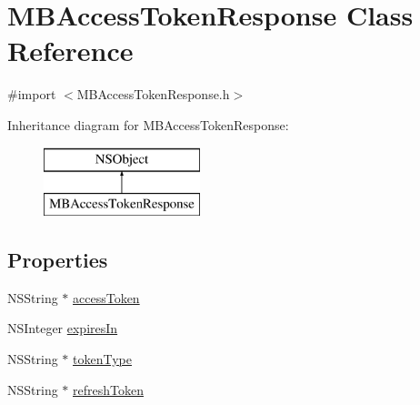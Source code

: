 \hypertarget{interface_m_b_access_token_response}{\section{M\-B\-Access\-Token\-Response Class Reference}
\label{interface_m_b_access_token_response}
}


{\ttfamily \#import $<$M\-B\-Access\-Token\-Response.\-h$>$}

Inheritance diagram for M\-B\-Access\-Token\-Response\-:\begin{figure}[H]
\begin{center}
\leavevmode
\includegraphics[height=2.000000cm]{interface_m_b_access_token_response}
\end{center}
\end{figure}
\subsection*{Properties}
\begin{DoxyCompactItemize}
\item 
N\-S\-String $\ast$ \hyperlink{interface_m_b_access_token_response_aae7d6df5c0e6da13e80b3ddb82ae7081}{access\-Token}
\item 
N\-S\-Integer \hyperlink{interface_m_b_access_token_response_ae251d07feaa95423629811e829c40f0a}{expires\-In}
\item 
N\-S\-String $\ast$ \hyperlink{interface_m_b_access_token_response_aebb1b1ab373299d1bbcb8edacfc117c2}{token\-Type}
\item 
N\-S\-String $\ast$ \hyperlink{interface_m_b_access_token_response_a52a523200e9ed6203d66dc7250c725dd}{refresh\-Token}
\end{DoxyCompactItemize}


